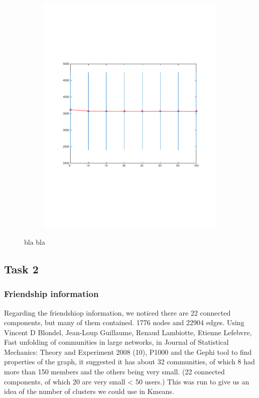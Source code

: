 \begin{figure}[h]
\begin{subfigure}[b]{0.45\textwidth}
    \includegraphics[width=\textwidth]{figures/kmeans_test.pdf}
    \caption{}
  \end{subfigure}
  \caption{bla bla}
  \label{fig:kmeans_final}
\end{figure}



\subsection{Task 2}
\subsubsection{Friendship information}
Regarding the friendshiop information, we noticed there are 22 connected components, but many of them contained.
1776 nodes and 22904 edges.
Using Vincent D Blondel, Jean-Loup Guillaume, Renaud Lambiotte, Etienne Lefebvre, Fast unfolding of communities in large networks, in Journal of Statistical Mechanics: Theory and Experiment 2008 (10), P1000 and the Gephi tool to find properties of the graph, it suggested it has about
32 communities, of which 8 had more than 150 members and the others being very small. (22 connected components, of which 20 are very small < 50 users.) This was run to give us an idea of the number of clusters we could use in Kmeans.

